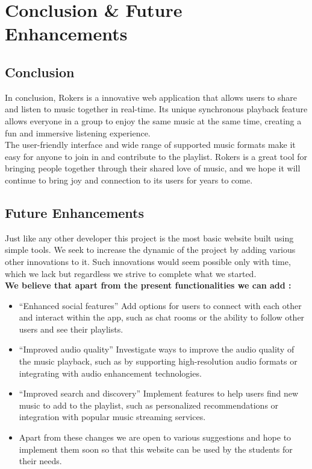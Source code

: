 \chapter{Conclusion \& Future Enhancements}
\section{Conclusion}
In conclusion, Rokers is a innovative web application that allows users to share and listen to music together in real-time. Its unique synchronous playback feature allows everyone in a group to enjoy the same music at the same time, creating a fun and immersive listening experience.\\[0.1in] 

The user-friendly interface and wide range of supported music formats make it easy for anyone to join in and contribute to the playlist. Rokers is a great tool for bringing people together through their shared love of music, and we hope it will continue to bring joy and connection to its users for years to come.\\[0.1in]
\section{Future Enhancements}
Just like any other developer this project is the most basic website built using simple tools. We seek to increase the dynamic of the project by adding various other innovations to it. Such innovations would seem possible only with time, which we lack but regardless we strive to complete what we started.
\\

\textbf{We believe that apart from the present functionalities we can add : }
\begin{itemize}
    \item “Enhanced social features” Add options for users to connect with each other and interact within the app, such as chat rooms or the ability to follow other users and see their playlists.
    \item “Improved audio quality” Investigate ways to improve the audio quality of the music playback, such as by supporting high-resolution audio formats or integrating with audio enhancement technologies.
    \item “Improved search and discovery” Implement features to help users find new music to add to the playlist, such as personalized recommendations or integration with popular music streaming services.\\[0.1in]
    \item Apart from these changes we are open to various suggestions and hope to implement them soon so that this website can be used by the students for their needs.

\end{itemize}
